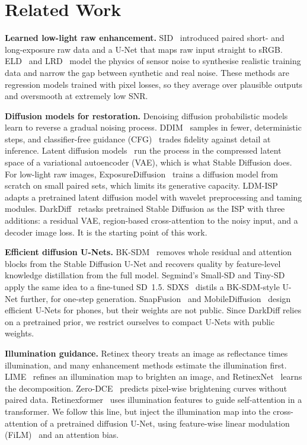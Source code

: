 \section{Related Work}
\label{sec:related}

\textbf{Learned low-light raw enhancement.}
SID~\cite{chen2018sid} introduced paired short- and long-exposure raw data and a U-Net that
maps raw input straight to sRGB. ELD~\cite{wei2020eld} and LRD~\cite{zhang2023lrd} model the
physics of sensor noise to synthesise realistic training data and narrow the gap between
synthetic and real noise. These methods are regression models trained with pixel losses, so they
average over plausible outputs and oversmooth at extremely low SNR.

\textbf{Diffusion models for restoration.}
Denoising diffusion probabilistic models~\cite{ho2020ddpm} learn to reverse a gradual noising
process. DDIM~\cite{song2021ddim} samples in fewer, deterministic steps, and classifier-free
guidance (CFG)~\cite{ho2022cfg} trades fidelity against detail at inference. Latent diffusion
models~\cite{rombach2022ldm} run the process in the compressed latent space of a variational
autoencoder (VAE), which is what Stable Diffusion does. For low-light raw images,
ExposureDiffusion~\cite{wang2023exposurediffusion} trains a diffusion model from scratch on
small paired sets, which limits its generative capacity. LDM-ISP~\cite{wen2023ldmisp} adapts a
pretrained latent diffusion model with wavelet preprocessing and taming modules.
DarkDiff~\cite{zheng2025darkdiff} retasks pretrained Stable Diffusion as the ISP with three
additions: a residual VAE, region-based cross-attention to the noisy input, and a decoder image
loss. It is the starting point of this work.

\textbf{Efficient diffusion U-Nets.}
BK-SDM~\cite{kim2024bksdm} removes whole residual and attention blocks from the Stable Diffusion
U-Net and recovers quality by feature-level knowledge distillation from the full model.
Segmind's Small-SD and Tiny-SD~\cite{segmind2023tinysd} apply the same idea to a fine-tuned
SD~1.5. SDXS~\cite{song2024sdxs} distils a BK-SDM-style U-Net further, for one-step generation.
SnapFusion~\cite{li2023snapfusion} and MobileDiffusion~\cite{zhao2024mobilediffusion} design
efficient U-Nets for phones, but their weights are not public. Since DarkDiff relies on a
pretrained prior, we restrict ourselves to compact U-Nets with public weights.

\textbf{Illumination guidance.}
Retinex theory treats an image as reflectance times illumination, and many enhancement methods
estimate the illumination first. LIME~\cite{guo2017lime} refines an illumination map to brighten
an image, and RetinexNet~\cite{wei2018retinexnet} learns the decomposition.
Zero-DCE~\cite{guo2020zerodce} predicts pixel-wise brightening curves without paired data.
Retinexformer~\cite{cai2023retinexformer} uses illumination features to guide self-attention in
a transformer. We follow this line, but inject the illumination map into the cross-attention of
a pretrained diffusion U-Net, using feature-wise linear modulation (FiLM)~\cite{perez2018film}
and an attention bias.
